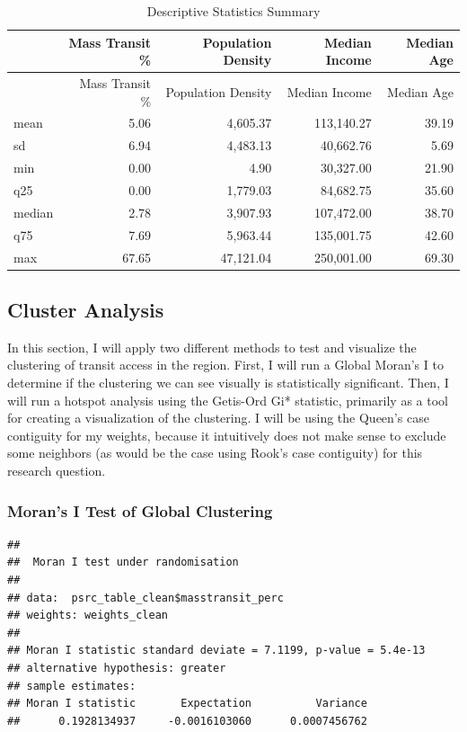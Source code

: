 \documentclass[
]{article}
\begin{document}
\begin{longtable}[]{@{}lrrrr@{}}
\caption{Descriptive Statistics Summary}\tabularnewline
\toprule\noalign{}
& Mass Transit \% & Population Density & Median Income & Median Age \\
\midrule\noalign{}
\endfirsthead
\toprule\noalign{}
& Mass Transit \% & Population Density & Median Income & Median Age \\
\midrule\noalign{}
\endhead
\bottomrule\noalign{}
\endlastfoot
mean & 5.06 & 4,605.37 & 113,140.27 & 39.19 \\
sd & 6.94 & 4,483.13 & 40,662.76 & 5.69 \\
min & 0.00 & 4.90 & 30,327.00 & 21.90 \\
q25 & 0.00 & 1,779.03 & 84,682.75 & 35.60 \\
median & 2.78 & 3,907.93 & 107,472.00 & 38.70 \\
q75 & 7.69 & 5,963.44 & 135,001.75 & 42.60 \\
max & 67.65 & 47,121.04 & 250,001.00 & 69.30 \\
\end{longtable}

\subsection{Cluster Analysis}\label{cluster-analysis}

In this section, I will apply two different methods to test and
visualize the clustering of transit access in the region. First, I will
run a Global Moran's I to determine if the clustering we can see
visually is statistically significant. Then, I will run a hotspot
analysis using the Getis-Ord Gi* statistic, primarily as a tool for
creating a visualization of the clustering. I will be using the Queen's
case contiguity for my weights, because it intuitively does not make
sense to exclude some neighbors (as would be the case using Rook's case
contiguity) for this research question.

\subsubsection{Moran's I Test of Global
Clustering}\label{morans-i-test-of-global-clustering}

\begin{verbatim}
## 
##  Moran I test under randomisation
## 
## data:  psrc_table_clean$masstransit_perc  
## weights: weights_clean    
## 
## Moran I statistic standard deviate = 7.1199, p-value = 5.4e-13
## alternative hypothesis: greater
## sample estimates:
## Moran I statistic       Expectation          Variance 
##      0.1928134937     -0.0016103060      0.0007456762
\end{verbatim}
\end{document}
